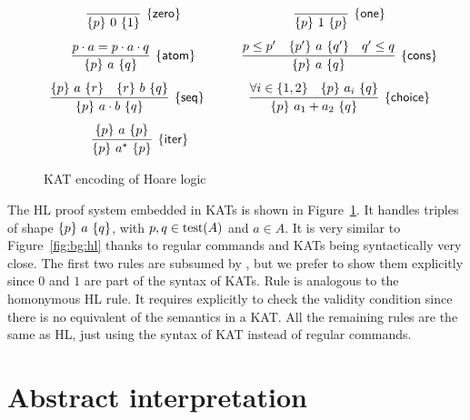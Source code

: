 \begin{figure}[t]
	\centering
	\begin{framed}
		\(
		\begin{array}{cc}
			\infer[\hlrule{zero}]
			{\overtriple{p}{0}{1}}
			{}
			\quad &
			\infer[\hlrule{one}]
			{\overtriple{p}{1}{p}}
			{}
			\\[7.5pt]
			\infer[\hlrule{atom}]
			{\overtriple{p}{a}{q}}
			{p \cdot a = p \cdot a \cdot q}
			\quad &
			\infer[\hlrule{cons}]
			{\overtriple{p}{a}{q}}
			{p \leq p' & \overtriple{p'}{a}{q'}& q' \leq q}
			\\[7.5pt]
			\infer[\hlrule{seq}]
			{\overtriple{p}{a \cdot b}{q}}
			{\overtriple{p}{a}{r} &
				\overtriple{r}{b}{q}}
			\qquad &
			\infer[\hlrule{choice}]
			{\overtriple{p}{a_1 + a_2}{q}}
			{\forall i \in \{ 1, 2 \} & \overtriple{p}{a_i}{q}}
			\\[7.5pt]
			\infer[\hlrule{iter}]
			{\overtriple{p}{a^\kstar}{p}}
			{\overtriple{p}{a}{p}}
		\end{array}
		\)
	\end{framed}
	\vspace{-1ex}
	\caption{KAT encoding of Hoare logic}\label{fig:bg:hl-kat}
\end{figure}
The HL proof system embedded in KATs is shown in Figure~\ref{fig:bg:hl-kat}. It handles triples of shape $\{p\}~a~\{q\}$, with $p, q \in \text{test}(A)$ and $a \in A$. It is very similar to Figure~\ref{fig:bg:hl} thanks to regular commands and KATs being syntactically very close. The first two rules are subsumed by , but we prefer to show them explicitly since $0$ and $1$ are part of the syntax of KATs. Rule  is analogous to the homonymous HL rule. It requires explicitly to check the validity condition since there is no equivalent of the semantics in a KAT. All the remaining rules are the same as HL, just using the syntax of KAT instead of regular commands.

\section{Abstract interpretation}\label{sec:bg:absint}
